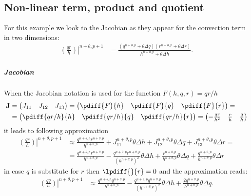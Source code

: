 \subsection{Non-linear term, product and quotient}
For this example we look  to the Jacobian as they appear for the convection term in two dimensions:
\begin{align}
    \left.\left(\frac{qr}{h}\right)\right|^{n+\theta, p+1} & = \frac{ \left(q^{n+\theta, p} + \theta  \Delta q\right)\left( r^{n+\theta, p} + \theta  \Delta r \right) }{ h^{n+\theta, p} + \theta  \Delta h}.
\end{align}

\subparagraph*{Jacobian}
When the Jacobian notation is  used for the function $F(h,q, r) = qr/h$
\begin{align}
    \mat{J} & =
    \begin{pmatrix}
        J_{11} & J_{12} & J_{13}
    \end{pmatrix}
    =
    \begin{pmatrix}
        \pdiff{F}{h} & \pdiff{F}{q} & \pdiff{F}{r}
    \end{pmatrix}
    =
    \\
    & = \begin{pmatrix}
        \pdiff{qr/h}{h} & \pdiff{qr/h}{q} & \pdiff{qr/h}{r}
    \end{pmatrix}
    =
    \begin{pmatrix}
        -\frac{qr}{h^2} & \frac{r}{h} & \frac{q}{h}
    \end{pmatrix}
\end{align}
it leads to following approximation
\begin{align}
    \left.\left(\frac{qr}{h}\right)\right|^{n+\theta, p+1} &  \approx  \frac{q^{n+\theta, p}r^{n+\theta, p}}{h^{n+\theta, p}}
    + J_{11}^{n+\theta, p} \theta\Delta h
    + J_{12}^{n+\theta, p} \theta\Delta q
    + J_{13}^{n+\theta, p} \theta\Delta r=
    \\
    & = \frac{q^{n+\theta, p}r^{n+\theta, p}}{h^{n+\theta, p}}
    - \frac{q^{n+\theta, p}r^{n+\theta, p}}{(h^{n+\theta, p})^2} \theta\Delta h
    + \frac{r^{n+\theta, p}}{h^{n+\theta, p}} \theta\Delta q
    + \frac{q^{n+\theta, p}}{h^{n+\theta, p}} \theta\Delta r
    \label{eq:2d_convection_equation}
\end{align}
in case $q$ is substitute for $r$ then $\lpdiff{}{r}=0$ and the approximation reads:
\begin{align}
    \left.\left(\frac{qq}{h}\right)\right|^{n+\theta, p+1} &  \approx
\frac{q^{n+\theta, p}q^{n+\theta, p}}{h^{n+\theta, p}}
- \frac{q^{n+\theta, p}q^{n+\theta, p}}{(h^{n+\theta, p})^2} \theta\Delta h
+ \frac{2 q^{n+\theta, p}}{h^{n+\theta, p}} \theta\Delta q.
\label{eq:convection_jacobian_qqh}
\end{align}

